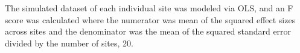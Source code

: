 The simulated dataset of each individual site was modeled via OLS, and an F score was calculated where the numerator was mean of the squared effect sizes across sites and the denominator was the mean of the squared standard error divided by the number of sites, 20.